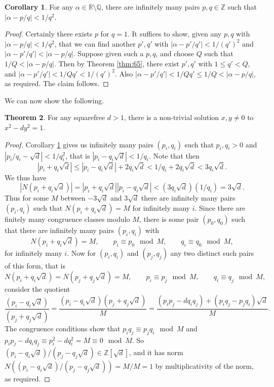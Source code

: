 \documentclass{article}
\newcommand{\Z}{\mathbb{Z}}
\newcommand{\Q}{\mathbb{Q}}
\newcommand{\R}{\mathbb{R}}
\newcommand{\rb}[1]{\left( #1 \right)}
\renewcommand{\sb}[1]{\left[ #1 \right]}
\newcommand{\abs}[1]{\left\lvert #1 \right\rvert}
\theoremstyle{definition}\newtheorem{definition}{Definition}
\theoremstyle{definition}\newtheorem{remark}[definition]{Remark}
\theoremstyle{definition}\newtheorem*{example}{Example}
\theoremstyle{definition}\newtheorem*{note}{Note}
\newtheorem{theorem}[definition]{Theorem}
\newtheorem{corollary}[definition]{Corollary}
\begin{document}
\begin{corollary}
\label{cor:66}
For any $ \alpha \in \R \setminus \Q $, there are infinitely many pairs $ p, q \in \Z $ such that $ \abs{\alpha - p / q} < 1 / q^2 $.
\end{corollary}

\begin{proof}
Certainly there exists $ p $ for $ q = 1 $. It suffices to show, given any $ p, q $ with $ \abs{\alpha - p / q} < 1 / q^2 $, that we can find another $ p', q' $ with $ \abs{\alpha - p' / q'} < 1 / \rb{q'}^2 $ and $ \abs{\alpha - p' / q'} < \abs{\alpha - p / q} $. Suppose given such a $ p, q $, and choose $ Q $ such that $ 1 / Q < \abs{\alpha - p / q} $. Then by Theorem \ref{thm:65}, there exist $ p', q' $ with $ 1 \le q' < Q $, and $ \abs{\alpha - p' / q'} < 1 / Qq' < 1 / \rb{q'}^2 $. Also $ \abs{\alpha - p' / q'} < 1 / Qq' \le 1 / Q < \abs{\alpha - p / q} $, as required. The claim follows.
\end{proof}

We can now show the following.

\begin{theorem}
For any squarefree $ d > 1 $, there is a non-trivial solution $ x, y \ne 0 $ to $ x^2 - dy^2 = 1 $.
\end{theorem}

\begin{proof}
Corollary \ref{cor:66} gives us infinitely many pairs $ \rb{p_i, q_i} $ such that $ p_i, q_i > 0 $ and $ \abs{p_i / q_i - \sqrt{d}} < 1 / q_i^2 $, that is $ \abs{p_i - q_i\sqrt{d}} < 1 / q_i $. Note that then
$$ \abs{p_i + q_i\sqrt{d}} \le \abs{p_i - q_i\sqrt{d}} + 2q_i\sqrt{d} < 1 / q_i + 2q_i\sqrt{d} < 3q_i\sqrt{d}. $$
We thus have
$$ \abs{N\rb{p_i + q_i\sqrt{d}}} = \abs{p_i + q_i\sqrt{d}}\abs{p_i - q_i\sqrt{d}} < \rb{3q_i\sqrt{d}}\rb{1 / q_i} = 3\sqrt{d}. $$
Thus for some $ M $ between $ -3\sqrt{d} $ and $ 3\sqrt{d} $ there are infinitely many pairs $ \rb{p_i, q_i} $ such that $ N\rb{p_i + q_i\sqrt{d}} = M $ for infinitely many $ i $. Since there are finitely many congruence classes modulo $ M $, there is some pair $ \rb{p_0, q_0} $ such that there are infinitely many pairs $ \rb{p_i, q_i} $ with
$$ N\rb{p_i + q_i\sqrt{d}} = M, \qquad p_i \equiv p_0 \mod M, \qquad q_i \equiv q_0 \mod M, $$
for infinitely many $ i $. Now for $ \rb{p_i, q_i} $ and $ \rb{p_j, q_j} $ any two distinct such pairs of this form, that is
$$ N\rb{p_i + q_i\sqrt{d}} = N\rb{p_j + q_j\sqrt{d}} = M, \qquad p_i \equiv p_j \mod M, \qquad q_i \equiv q_j \mod M, $$
consider the quotient
$$ \dfrac{\rb{p_i - q_i\sqrt{d}}}{\rb{p_j + q_j\sqrt{d}}} = \dfrac{\rb{p_i - q_i\sqrt{d}}\rb{p_j + q_j\sqrt{d}}}{M} = \dfrac{\rb{p_ip_j - dq_iq_j} + \rb{p_iq_j - p_jq_i}\sqrt{d}}{M}. $$
The congruence conditions show that $ p_iq_j \equiv p_jq_i \mod M $ and $ p_ip_j - dq_iq_j \equiv p_i^2 - dq_i^2 = M \equiv 0 \mod M $. So $ \rb{p_i - q_i\sqrt{d}} / \rb{p_j - q_j\sqrt{d}} \in \Z\sb{\sqrt{d}} $, and it has norm $ N\rb{\rb{p_i - q_i\sqrt{d}} / \rb{p_j - q_j\sqrt{d}}} = M / M = 1 $ by multiplicativity of the norm, as required.
\end{proof}
\end{document}
